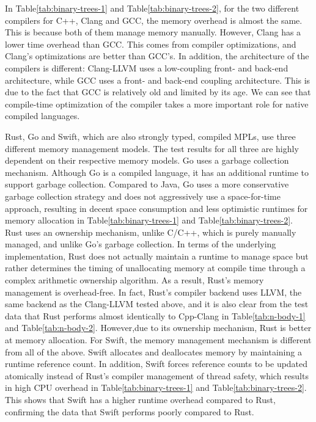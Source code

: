 In Table\ref{tab:binary-trees-1} and Table\ref{tab:binary-trees-2},
for the two different compilers for C++, Clang and GCC, the memory overhead is almost the same.
This is because both of them manage memory manually.
However, Clang has a lower time overhead than GCC. This comes from compiler optimizations,
and Clang's optimizations are better than GCC's. In addition, the architecture of the compilers is different:
Clang-LLVM uses a low-coupling front- and back-end architecture, while GCC uses a front- and back-end coupling
architecture. This is due to the fact that GCC is relatively old and limited by its age.
We can see that compile-time optimization of the compiler takes a more important role for native compiled languages.

Rust, Go and Swift, which are also strongly typed, compiled MPLs,
use three different memory management models.
The test results for all three are highly dependent on their
respective memory models. Go uses a garbage collection mechanism.
Although Go is a compiled language, it has an additional runtime to support garbage collection.
Compared to Java, Go uses a more conservative garbage collection strategy and does
not aggressively use a space-for-time approach, resulting in decent space consumption
and less optimistic runtimes for memory allocation in Table\ref{tab:binary-trees-1} and Table\ref{tab:binary-trees-2}.
Rust uses an ownership mechanism,
unlike C/C++, which is purely manually managed, and unlike Go's garbage collection.
In terms of the underlying implementation, Rust does not actually maintain a runtime
to manage space but rather determines the timing of unallocating memory at compile
time through a complex arithmetic ownership algorithm. As a result, Rust's memory
management is overhead-free. In fact, Rust's compiler backend uses LLVM, the same
backend as the Clang-LLVM tested above, and it is also clear from the test data that
Rust performs almost identically to Cpp-Clang in Table\ref{tab:n-body-1} and Table\ref{tab:n-body-2}.
However,due to its ownership mechanism, Rust is better at memory allocation. For Swift,
the memory management mechanism is different from all of the above. Swift allocates
and deallocates memory by maintaining a runtime reference count. In addition,
Swift forces reference counts to be updated atomically instead of Rust's compiler
management of thread safety, which results in high CPU overhead in Table\ref{tab:binary-trees-1} and Table\ref{tab:binary-trees-2}. This shows that
Swift has a higher runtime overhead compared to Rust, confirming the data that
Swift performs poorly compared to Rust.

